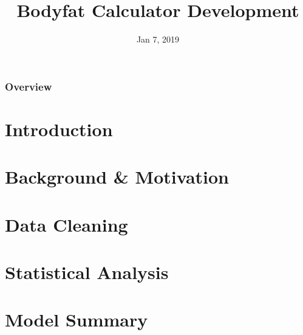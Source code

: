 \documentclass{beamer}
\title[STAT 628]{Bodyfat Calculator Development} %
\author[Ning Shen, Ruyi Yan, Yiqun Jiang]{} %
\institute[] %
{
Ning Shen, Ruyi Yan, Yiqun Jiang \\ %
\medskip
}
\date{Jan 7, 2019} %
\begin{document}
\begin{frame}
\titlepage %
\end{frame}

\begin{frame}
\frametitle{Overview} %
\tableofcontents %
\end{frame}


\section{Introduction} %


\section{Background \& Motivation}
\section{Data Cleaning}
\section{Statistical Analysis}
\section{Model Summary}
\end{document}

